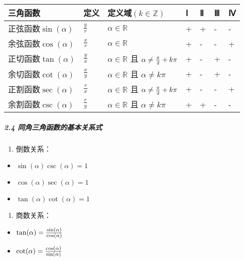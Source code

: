\documentclass[
]{article}
\begin{document}
\begin{longtable}[]{@{}lllllll@{}}
\toprule
三角函数 & 定义 & 定义域\((k \in \mathbb Z)\) & Ⅰ & Ⅱ & Ⅲ & Ⅳ \\
\midrule
\endhead
正弦函数\(\sin(\alpha)\) & \(\frac{y}{r}\) & \(\alpha \in \mathbb R\) &
+ & + & - & - \\
余弦函数\(\cos(\alpha)\) & \(\frac{x}{r}\) & \(\alpha \in \mathbb R\) &
+ & - & - & + \\
正切函数\(\tan(\alpha)\) & \(\frac{y}{x}\) & \(\alpha \in \mathbb R\) 且
\(\alpha \neq {\pi \over 2} + k\pi\) & + & - & + & - \\
余切函数\(\cot(\alpha)\) & \(\frac{x}{y}\) & \(\alpha \in \mathbb R\) 且
\(\alpha \neq k\pi\) & + & - & + & - \\
正割函数\(\sec(\alpha)\) & \(\frac{r}{x}\) & \(\alpha \in \mathbb R\) 且
\(\alpha \neq {\pi \over 2} + k\pi \) & + & - & - & + \\
余割函数\(\csc(\alpha)\) & \(\frac{r}{y}\) & \(\alpha \in \mathbb R\) 且
\(\alpha \neq k\pi\) & + & + & - & - \\
\bottomrule
\end{longtable}

\hypertarget{24--ux540cux89d2ux4e09ux89d2ux51fdux6570ux7684ux57faux672cux5173ux7cfbux5f0f}{%
\subparagraph{2.4
同角三角函数的基本关系式}\label{24--ux540cux89d2ux4e09ux89d2ux51fdux6570ux7684ux57faux672cux5173ux7cfbux5f0f}}

\begin{enumerate}
\def\labelenumi{\arabic{enumi}.}
\item
  倒数关系：
\end{enumerate}

\begin{itemize}
\item
  \(\sin(\alpha)\csc(\alpha) = 1\)
\item
  \(\cos(\alpha)\sec(\alpha) = 1\)
\item
  \(\tan(\alpha)\cot(\alpha) = 1\)
\end{itemize}

\begin{enumerate}
\def\labelenumi{\arabic{enumi}.}
\item
  商数关系：
\end{enumerate}

\begin{itemize}
\item
  \(\tan(\alpha) = {\sin(\alpha) \over \cos(\alpha)}\)
\item
  \(\cot(\alpha) = {\cos(\alpha) \over \sin(\alpha)}\)
\end{itemize}
\end{document}
